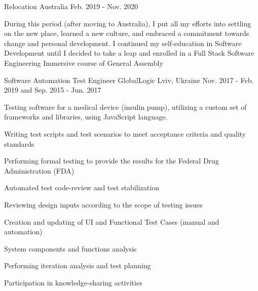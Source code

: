 \begin{cventries}
 \cventry
    {} %
    {Relocation} %
    {Australia} %
    {Feb. 2019 - Nov. 2020} %
    {
    {During this period (after moving to Australia), I put all my efforts into settling on the new place, learned a new culture, and embraced a commitment towards change and personal development. I continued my self-education in Software Development until I decided to take a leap and enrolled in a Full Stack Software Engineering Immersive course of General Assembly}
    \begin{cvparagraph}
    \end{cvparagraph}
    }



  \cventry
    {Software Automation Test Engineer} %
    {GlobalLogic} %
    {Lviv, Ukraine} %
    {Nov. 2017 - Feb. 2019 and Sep. 2015 - Jun. 2017} %
    {
      \begin{cvitems} %
    \item{
    Testing software for a medical device (insulin pump), utilizing a custom set of frameworks and libraries, using JavaScript language.
    }
        \item {Writing test scripts and test scenarios to meet acceptance criteria and quality standards}
        \item {Performing formal testing to provide the results for the Federal Drug Administration (FDA)}
        \item {Automated test code-review and test stabilization}
        \item {Reviewing design inputs according to the scope of testing issues}
        \item {Creation and updating of UI and Functional Test Cases (manual and automation)}
        \item {System components and functions analysis}
        \item {Performing iteration analysis and test planning}
        \item {Participation in knowledge-sharing activities}
      \end{cvitems}
    }


\end{cventries}
